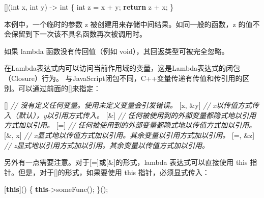 \documentclass[
]{article}
\newenvironment{Shaded}{}{}
\newcommand{\CommentTok}[1]{\textcolor[rgb]{0.38,0.63,0.69}{\textit{#1}}}
\newcommand{\ControlFlowTok}[1]{\textcolor[rgb]{0.00,0.44,0.13}{\textbf{#1}}}
\newcommand{\DataTypeTok}[1]{\textcolor[rgb]{0.56,0.13,0.00}{#1}}
\newcommand{\KeywordTok}[1]{\textcolor[rgb]{0.00,0.44,0.13}{\textbf{#1}}}
\newcommand{\NormalTok}[1]{#1}
\newcommand{\OperatorTok}[1]{\textcolor[rgb]{0.40,0.40,0.40}{#1}}
\begin{document}
\begin{Shaded}
\begin{Highlighting}[]
\OperatorTok{[](}\DataTypeTok{int}\NormalTok{ x}\OperatorTok{,} \DataTypeTok{int}\NormalTok{ y}\OperatorTok{)} \OperatorTok{{-}\textgreater{}} \DataTypeTok{int} \OperatorTok{\{} \DataTypeTok{int}\NormalTok{ z }\OperatorTok{=}\NormalTok{ x }\OperatorTok{+}\NormalTok{ y}\OperatorTok{;} \ControlFlowTok{return}\NormalTok{ z }\OperatorTok{+}\NormalTok{ x}\OperatorTok{;} \OperatorTok{\}}
\end{Highlighting}
\end{Shaded}

本例中，一个临时的参数 z 被创建用来存储中间结果。如同一般的函数，z
的值不会保留到下一次该不具名函数再次被调用时。

如果 lambda 函数没有传回值（例如 void），其回返类型可被完全忽略。

在Lambda表达式内可以访问当前作用域的变量，这是Lambda表达式的闭包（Closure）行为。
与JavaScript闭包不同，C++变量传递有传值和传引用的区别。可以通过前面的{[}{]}来指定：

\begin{Shaded}
\begin{Highlighting}[]
\OperatorTok{[]}      \CommentTok{// 沒有定义任何变量。使用未定义变量会引发错误。}
\OperatorTok{[}\NormalTok{x}\OperatorTok{,} \OperatorTok{\&}\NormalTok{y}\OperatorTok{]} \CommentTok{// x以传值方式传入（默认），y以引用方式传入。}
\OperatorTok{[\&]}     \CommentTok{// 任何被使用到的外部变量都隐式地以引用方式加以引用。}
\OperatorTok{[=]}     \CommentTok{// 任何被使用到的外部变量都隐式地以传值方式加以引用。}
\OperatorTok{[\&,}\NormalTok{ x}\OperatorTok{]}  \CommentTok{// x显式地以传值方式加以引用。其余变量以引用方式加以引用。}
\OperatorTok{[=,} \OperatorTok{\&}\NormalTok{z}\OperatorTok{]} \CommentTok{// z显式地以引用方式加以引用。其余变量以传值方式加以引用。}
\end{Highlighting}
\end{Shaded}

另外有一点需要注意。对于{[}={]}或{[}\&{]}的形式，lambda
表达式可以直接使用 this 指针。但是，对于{[}{]}的形式，如果要使用 this
指针，必须显式传入：

\begin{Shaded}
\begin{Highlighting}[]
\OperatorTok{[}\KeywordTok{this}\OperatorTok{]()} \OperatorTok{\{} \KeywordTok{this}\OperatorTok{{-}\textgreater{}}\NormalTok{someFunc}\OperatorTok{();} \OperatorTok{\}();}
\end{Highlighting}
\end{Shaded}
\end{document}
